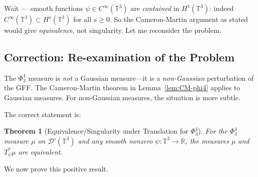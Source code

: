 \documentclass[12pt]{article}
\newtheorem{theorem}{Theorem}
\theoremstyle{definition}
\begin{document}
Wait — smooth functions $\psi \in C^\infty(\mathbb{T}^3)$ are \emph{contained} in $H^1(\mathbb{T}^3)$: indeed $C^\infty(\mathbb{T}^3) \subset H^s(\mathbb{T}^3)$ for all $s \geq 0$. So the Cameron-Martin argument as stated would give \emph{equivalence}, not singularity. Let me reconsider the problem.

\subsection{Correction: Re-examination of the Problem}

The $\Phi^4_3$ measure is \emph{not} a Gaussian measure—it is a \emph{non-Gaussian} perturbation of the GFF. The Cameron-Martin theorem in Lemma~\ref{lem:CM-phi4} applies to Gaussian measures. For non-Gaussian measures, the situation is more subtle.

The correct statement is:

\begin{theorem}[Equivalence/Singularity under Translation for $\Phi^4_3$]\label{thm:correct}
For the $\Phi^4_3$ measure $\mu$ on $\mathcal{D}'(\mathbb{T}^3)$ and any smooth nonzero $\psi\colon\mathbb{T}^3\to\mathbb{R}$, the measures $\mu$ and $T_\psi^*\mu$ are \emph{equivalent}.
\end{theorem}

We now prove this positive result.
\end{document}
